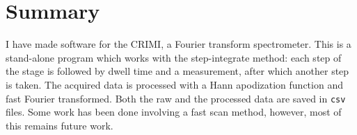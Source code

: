 
\section{Summary}

I have made software for the CRIMI, a Fourier transform spectrometer. This is a stand-alone program which works with the step-integrate method: each step of the stage is followed by dwell time and a measurement, after which another step is taken. The acquired data is processed with a Hann apodization function and fast Fourier transformed. Both the raw and the processed data are saved in \verb!csv! files. Some work has been done involving a fast scan method, however, most of this remains future work.